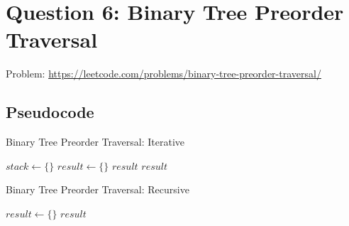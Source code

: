 \documentclass[11pt]{article}
\begin{document}
\newpage

\section{Question 6: Binary Tree Preorder Traversal}
Problem: \url{https://leetcode.com/problems/binary-tree-preorder-traversal/}

\subsection{Pseudocode}


\begin{algorithm}[H]
    \caption{Binary Tree Preorder Traversal: Iterative}
    \begin{algorithmic}
            \State $stack \gets \{\}$
            \State $result \gets \{\}$
                \State \Return $result$
            \EndIf
            \State {}
            \State {}
                \State {}
                \State {}
                    \State {}
                \EndIf
                    \State {}
                \EndIf
            \EndWhile
            \State \Return $result$
        \EndFunction
    \end{algorithmic}
\end{algorithm}


\begin{algorithm}[H]
    \caption{Binary Tree Preorder Traversal: Recursive}
    \begin{algorithmic}
        \State \vspace{0.0cm}
            \State $result \gets \{\}$
            \State {}
            \State \Return $result$
        \EndFunction
        \State \vspace{0.0cm}
                \State \Return
            \EndIf
            \State {}
            \State {}
            \State {}
        \EndFunction
        \State \vspace{0.0cm}
    \end{algorithmic}
\end{algorithm}
\end{document}
